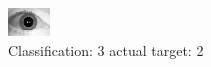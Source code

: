 \begin{figure}[h!]
\begin{center}
\includegraphics[width=0.60\columnwidth]{figures/ID1705_class_3_target_2.png}
\end{center}
\caption{ Classification: 3 actual target: 2}
\label{fig:ID1705_class_3_target_2}
\end{figure}
